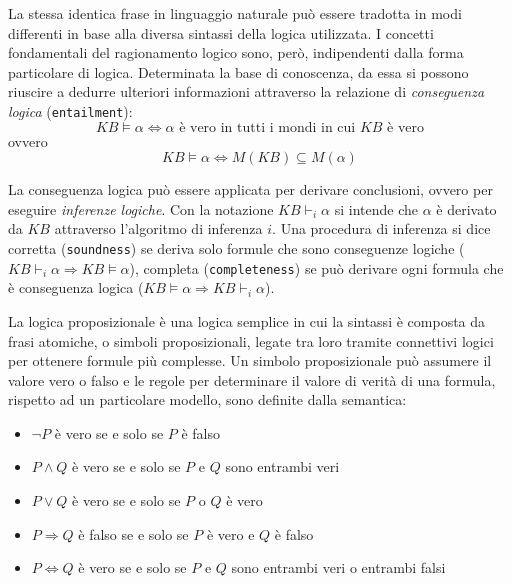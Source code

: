 		La stessa identica frase in linguaggio naturale può essere tradotta in modi differenti in base alla diversa sintassi della logica utilizzata. I concetti fondamentali del ragionamento logico sono, però, indipendenti dalla forma particolare di logica. Determinata la base di conoscenza, da essa si possono riuscire a dedurre ulteriori informazioni attraverso la relazione di \emph{conseguenza logica} (\texttt{entailment}):
		\begin{equation}
		KB\vDash\alpha \iff \alpha \mbox{ è vero in tutti i mondi in cui } KB \mbox{ è vero}
		\end{equation}
		ovvero
		\begin{equation}
		KB\vDash\alpha \iff M(KB)\subseteq M(\alpha)
		\end{equation}\par
		La conseguenza logica può essere applicata per derivare conclusioni, ovvero per eseguire \emph{inferenze logiche}. Con la notazione $KB\vdash_{i}\alpha$ si intende che $\alpha$ è derivato da $KB$ attraverso l'algoritmo di inferenza $i$. Una procedura di inferenza si dice corretta (\texttt{soundness}) se deriva solo formule che sono conseguenze logiche ($KB\vdash_{i}\alpha\Longrightarrow KB\vDash\alpha$), completa (\texttt{completeness}) se può derivare ogni formula che è conseguenza logica ($KB\vDash\alpha\Longrightarrow KB\vdash_{i}\alpha$).\par
		La logica proposizionale è una logica semplice in cui la sintassi è composta da frasi atomiche, o simboli proposizionali, legate tra loro tramite connettivi logici per ottenere formule più complesse. Un simbolo proposizionale può assumere il valore vero o falso e le regole per determinare il valore di verità di una formula, rispetto ad un particolare modello, sono definite dalla semantica: 
		\begin{itemize}
			\item $\neg P$ è vero se e solo se $P$ è falso
			\item $P\wedge Q$ è vero se e solo se $P$ e $Q$ sono entrambi veri
			\item $P\vee Q$ è vero se e solo se $P$ o $Q$ è vero
			\item $P\Rightarrow Q$ è falso se e solo se $P$ è vero e $Q$ è falso
			\item $P\Leftrightarrow Q$ è vero se e solo se $P$ e $Q$ sono entrambi veri o entrambi falsi
		\end{itemize}
